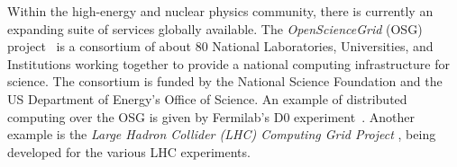 Within the high-energy and nuclear physics community, there is currently an 
expanding suite of services globally available.  The {\it OpenScienceGrid} 
(OSG) project~\cite{ref:OSG} is a consortium of about 80 National 
Laboratories, Universities, and Institutions working together to provide a 
national computing infrastructure for science.  The consortium is funded by 
the National Science Foundation and the US Department of Energy's Office of 
Science.  An example of distributed computing over the OSG is given by 
Fermilab's D0 experiment~\cite{ref:D0}.  Another example is the 
{\it Large Hadron Collider (LHC) Computing Grid Project}
\cite{ref:LHC,ref:LHC2}, being developed for the various LHC experiments.

